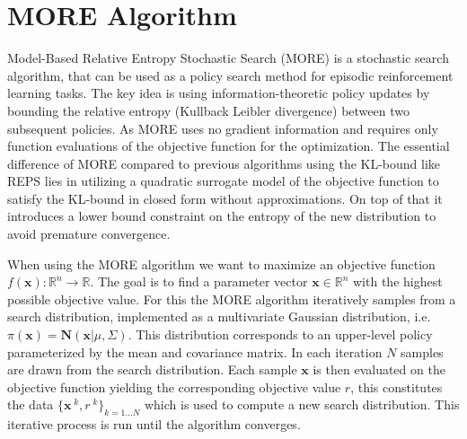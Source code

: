 \section{MORE Algorithm}
Model-Based Relative Entropy Stochastic Search (MORE) \citep{abdolmaleki2015model} is a
stochastic search algorithm, that can be used
as a policy search method for episodic reinforcement
learning tasks. The key idea is
using information-theoretic policy updates
by bounding the relative entropy (Kullback Leibler divergence)
between two subsequent policies.
As MORE uses no gradient information and requires only function evaluations
of the objective function for the optimization.
The essential difference of MORE compared to previous algorithms using
the KL-bound like REPS \citep{peters2010relative} lies in utilizing
a quadratic surrogate model of the objective function
to  satisfy the KL-bound in closed form without approximations.
On top of that it
introduces a lower bound constraint on the entropy of the new distribution
to avoid premature convergence.

When using the MORE algorithm we want to maximize an objective function
$f(\mathbf{x}): \mathbb{R}^n \rightarrow \mathbb{R}$. The goal is
to find a parameter vector $\mathbf{x} \in \mathbb{R}^n$ with the
highest possible objective value. For this the
MORE algorithm iteratively samples from  a search distribution, implemented
as a multivariate Gaussian distribution, i.e.
$\pi(\mathbf{x}) = \mathbf{N}(\mathbf{x} | \mu, \Sigma)$.
This distribution corresponds to an upper-level policy
parameterized by the mean and covariance matrix.
In each iteration $N$ samples are drawn from the
search distribution. Each sample $\mathbf{x}$ is then
evaluated on the objective function yielding the corresponding
objective value $r$, this constitutes the data
$\{\mathbf{x}^{\;k}, r^{\;k}\}_{k=1...N}$ which is
used to compute a new search distribution.
This iterative process is run until the algorithm converges.





